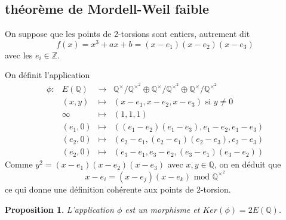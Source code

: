 \documentclass{article}
\newtheorem{proposition}{Proposition}
\begin{document}
\subsection{théorème de Mordell-Weil faible}
On suppose que les points de 2-torsions sont entiers, autrement dit
\begin{equation*}
f(x)= x^3 + ax + b = (x-e_{1})(x-e_{2})(x-e_{3})
\end{equation*}
avec les $e_{i} \in \mathbb{Z}$.

On définit l'application 
\begin{equation*}
\begin{array}{lrcl}
\phi :&E(\mathbb{Q}) & \longrightarrow & \mathbb{Q}^{\times}/\mathbb{Q}^{\times^2}
\oplus \mathbb{Q}^{\times}/\mathbb{Q}^{\times^2} \oplus \mathbb{Q}^{\times}/\mathbb{Q}^{\times^2} \\
	 & (x,y) & \longmapsto & (x-e_{1}, x-e_{2}, x-e_{3}) \text{ si } y \neq 0 \\
	 & \infty & \longmapsto & (1, 1, 1) \\
	 & (e_{1}, 0) & \longmapsto & ((e_{1} - e_{2})(e_{1} - e_{3}), e_{1} - e_{2}, e_{1} - e_{3})\\
	 & (e_{2}, 0) & \longmapsto & (e_{2} - e_{1}, (e_{2} - e_{1})(e_{2} - e_{3}), e_{2} - e_{3})\\
	 & (e_{2}, 0) & \longmapsto & (e_{3} - e_{1}, e_{3} - e_{2}, (e_{3} - e_{1})(e_{3} - e_{2}))
\end{array}
\end{equation*}
Comme $y^2 = (x-e_{1})(x-e_{2})(x-e_{3})$ avec $x, y \in \mathbb{Q}$, on en déduit que 
\begin{equation*}
x-e_{i} = (x-e_{j})(x-e_{k}) \text{ mod } \mathbb{Q}^{\times^2}
\end{equation*}
ce qui donne une définition cohérente aux points de 2-torsion.

\begin{proposition}
L'application $\phi$ est un morphisme et $Ker(\phi) = 2E(\mathbb{Q})$.
\end{proposition}
\end{document}
